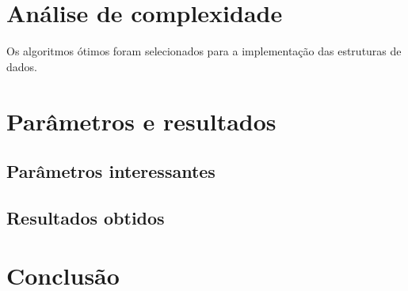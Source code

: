 \documentclass{article}
\begin{document}
\section{Análise de complexidade}
Os algoritmos ótimos foram selecionados para a implementação das estruturas de dados. 


\section{Parâmetros e resultados}

\subsection{Parâmetros interessantes}

\subsection{Resultados obtidos}


\section{Conclusão}
\end{document}
